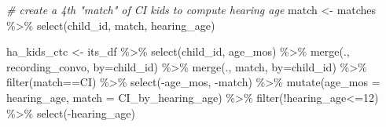 \documentclass[
]{article}
\newenvironment{Shaded}{\begin{snugshade}}{\end{snugshade}}
\newcommand{\AttributeTok}[1]{\textcolor[rgb]{0.77,0.63,0.00}{#1}}
\newcommand{\CommentTok}[1]{\textcolor[rgb]{0.56,0.35,0.01}{\textit{#1}}}
\newcommand{\DecValTok}[1]{\textcolor[rgb]{0.00,0.00,0.81}{#1}}
\newcommand{\FunctionTok}[1]{\textcolor[rgb]{0.00,0.00,0.00}{#1}}
\newcommand{\NormalTok}[1]{#1}
\newcommand{\OtherTok}[1]{\textcolor[rgb]{0.56,0.35,0.01}{#1}}
\newcommand{\SpecialCharTok}[1]{\textcolor[rgb]{0.00,0.00,0.00}{#1}}
\newcommand{\StringTok}[1]{\textcolor[rgb]{0.31,0.60,0.02}{#1}}
\begin{document}
\begin{Shaded}
\begin{Highlighting}[]
\CommentTok{\# create a 4th "match" of CI kids to compute hearing age}
\NormalTok{match }\OtherTok{\textless{}{-}}\NormalTok{ matches }\SpecialCharTok{\%\textgreater{}\%} \FunctionTok{select}\NormalTok{(child\_id, match, hearing\_age)}

\NormalTok{ha\_kids\_ctc }\OtherTok{\textless{}{-}}\NormalTok{ its\_df }\SpecialCharTok{\%\textgreater{}\%}
  \FunctionTok{select}\NormalTok{(child\_id, age\_mos) }\SpecialCharTok{\%\textgreater{}\%}
  \FunctionTok{merge}\NormalTok{(., recording\_convo, }\AttributeTok{by=}\StringTok{\textquotesingle{}child\_id\textquotesingle{}}\NormalTok{) }\SpecialCharTok{\%\textgreater{}\%}
  \FunctionTok{merge}\NormalTok{(., match, }\AttributeTok{by=}\StringTok{\textquotesingle{}child\_id\textquotesingle{}}\NormalTok{) }\SpecialCharTok{\%\textgreater{}\%}
  \FunctionTok{filter}\NormalTok{(match}\SpecialCharTok{==}\StringTok{\textquotesingle{}CI\textquotesingle{}}\NormalTok{) }\SpecialCharTok{\%\textgreater{}\%}
  \FunctionTok{select}\NormalTok{(}\SpecialCharTok{{-}}\NormalTok{age\_mos, }\SpecialCharTok{{-}}\NormalTok{match) }\SpecialCharTok{\%\textgreater{}\%}
  \FunctionTok{mutate}\NormalTok{(}\AttributeTok{age\_mos =}\NormalTok{ hearing\_age,}
         \AttributeTok{match =} \StringTok{\textquotesingle{}CI\_by\_hearing\_age\textquotesingle{}}\NormalTok{) }\SpecialCharTok{\%\textgreater{}\%}
  \FunctionTok{filter}\NormalTok{(}\SpecialCharTok{!}\NormalTok{hearing\_age}\SpecialCharTok{\textless{}=}\DecValTok{12}\NormalTok{) }\SpecialCharTok{\%\textgreater{}\%}
  \FunctionTok{select}\NormalTok{(}\SpecialCharTok{{-}}\NormalTok{hearing\_age)}


\end{Highlighting}
\end{Shaded}
\end{document}
